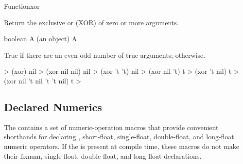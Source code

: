 \documentclass[10pt,twoside,english,pdftex]{article}
\begin{document}

\begin{functiondoc}{Function}{xor}{  
   \returns{} }

\fnsyntax

\fnpurpose Return the exclusive or (XOR) of zero or more arguments.

\fnpackage {}

\fnmodule {}

\fnargs
\begin{args}{boolean}
\arg[arg] A  (an object)
\arg[boolean] A 
\end{args}

\fnreturns True if there are an even odd number of true arguments; \nil{}
otherwise.

\fnexamples
%
\W\supp
\begin{example}
  > (xor)
  nil
  > (xor nil nil)
  nil
  > (xor 't 't)
  nil\goodpagebreak
  > (xor nil 't)
  t
  > (xor 't nil)
  t
  > (xor nil 't nil 't 't nil)
  t
  >
\end{example}

\end{functiondoc}


\W\renewcommand{\subsubentities}{1}

\T\markright{}%
\T\pagestyle{plain}
\T\clearpage
\W{}
\T\pagestyle{fancy}
\T\thispagestyle{fancybottom}
\T\global\def\fnlastname{ }%
\subsection{Declared Numerics}
\label{sec:declared-numerics}%
\label{ent:incfAMP}%

%
%
%
%
%
%
%
%
The   contains a set of
numeric-operation macros that provide convenient shorthands for
declaring , short-float, single-float, double-float, and
long-float numeric operators. If the 
\textbf{} is present at compile time, these
macros do not make their fixnum, single-float, double-float, and long-float
declarations.
\end{document}
